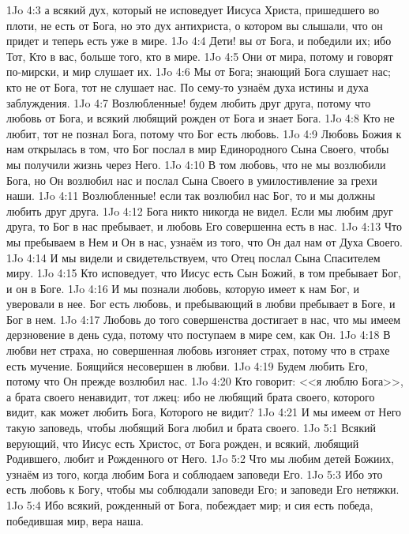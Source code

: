 \vs 1Jo 4:3 а всякий дух, который не исповедует Иисуса Христа, пришедшего во плоти, не есть от Бога, но это дух антихриста, о котором вы слышали, что он придет и теперь есть уже в мире.
\rsbpar\vs 1Jo 4:4 Дети! вы от Бога, и победили их; ибо Тот, Кто в вас, больше того, кто в мире.
\vs 1Jo 4:5 Они от мира, потому и говорят по-мирски, и мир слушает их.
\vs 1Jo 4:6 Мы от Бога; знающий Бога слушает нас; кто не от Бога, тот не слушает нас. По сему-то узнаём духа истины и духа заблуждения.
\rsbpar\vs 1Jo 4:7 Возлюбленные! будем любить друг друга, потому что любовь от Бога, и всякий любящий рожден от Бога и знает Бога.
\vs 1Jo 4:8 Кто не любит, тот не познал Бога, потому что Бог есть любовь.
\vs 1Jo 4:9 Любовь Божия к нам открылась в том, что Бог послал в мир Единородного Сына Своего, чтобы мы получили жизнь через Него.
\vs 1Jo 4:10 В том любовь, что не мы возлюбили Бога, но Он возлюбил нас и послал Сына Своего в умилостивление за грехи наши.
\rsbpar\vs 1Jo 4:11 Возлюбленные! если так возлюбил нас Бог, то и мы должны любить друг друга.
\vs 1Jo 4:12 Бога никто никогда не видел. Если мы любим друг друга, то Бог в нас пребывает, и любовь Его совершенна есть в нас.
\vs 1Jo 4:13 Что мы пребываем в Нем и Он в нас, узнаём из того, что Он дал нам от Духа Своего.
\vs 1Jo 4:14 И мы видели и свидетельствуем, что Отец послал Сына Спасителем миру.
\vs 1Jo 4:15 Кто исповедует, что Иисус есть Сын Божий, в том пребывает Бог, и он в Боге.
\vs 1Jo 4:16 И мы познали любовь, которую имеет к нам Бог, и уверовали в нее. Бог есть любовь, и пребывающий в любви пребывает в Боге, и Бог в нем.
\vs 1Jo 4:17 Любовь до того совершенства достигает в нас, что мы имеем дерзновение в день суда, потому что поступаем в мире сем, как Он.
\vs 1Jo 4:18 В любви нет страха, но совершенная любовь изгоняет страх, потому что в страхе есть мучение. Боящийся несовершен в любви.
\vs 1Jo 4:19 Будем любить Его, потому что Он прежде возлюбил нас.
\vs 1Jo 4:20 Кто говорит: <<я люблю Бога>>, а брата своего ненавидит, тот лжец: ибо не любящий брата своего, которого видит, как может любить Бога, Которого не видит?
\vs 1Jo 4:21 И мы имеем от Него такую заповедь, чтобы любящий Бога любил и брата своего.
\vs 1Jo 5:1 Всякий верующий, что Иисус есть Христос, от Бога рожден, и всякий, любящий Родившего, любит и Рожденного от Него.
\vs 1Jo 5:2 Что мы любим детей Божиих, узнаём из того, когда любим Бога и соблюдаем заповеди Его.
\vs 1Jo 5:3 Ибо это есть любовь к Богу, чтобы мы соблюдали заповеди Его; и заповеди Его нетяжки.
\vs 1Jo 5:4 Ибо всякий, рожденный от Бога, побеждает мир; и сия есть победа, победившая мир, вера наша.
